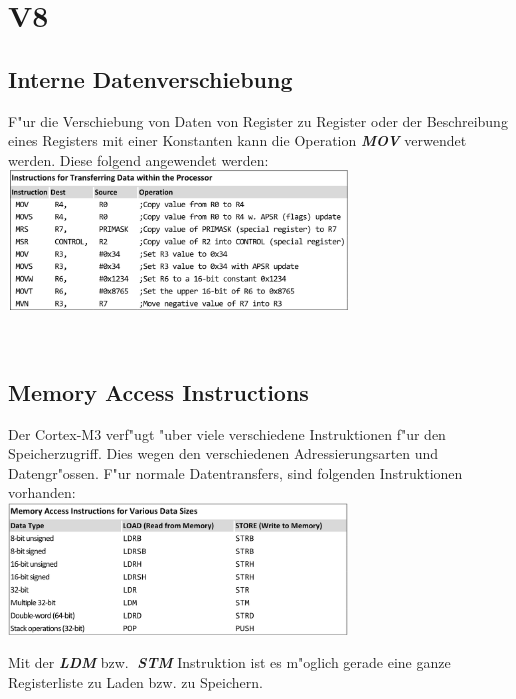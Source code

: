 \section{V8}
\begin{minipage}[t]{9cm}
	\subsection{Interne Datenverschiebung}
F"ur die Verschiebung von Daten von Register zu Register oder der Beschreibung eines Registers mit einer Konstanten kann die Operation \textbf{\textit{MOV} }verwendet werden. Diese folgend angewendet werden: \\

\includegraphics[width=9cm]{images/MOV-Instruktion}
\end{minipage}
%
\begin{minipage}[t]{0.5cm}
	\-\
\end{minipage}
%
\begin{minipage}[t]{9cm}
	\subsection{Memory Access Instructions}
Der Cortex-M3 verf"ugt "uber viele verschiedene Instruktionen f"ur den Speicherzugriff. Dies wegen den verschiedenen Adressierungsarten und Datengr"ossen. F"ur normale Datentransfers, sind folgenden Instruktionen vorhanden:\\

\includegraphics[width=9cm]{images/LDR-Instruktion}

Mit der \textbf{\textit{LDM}} bzw. \textbf{\textit{STM}} Instruktion ist es m"oglich gerade eine ganze Registerliste zu Laden bzw. zu Speichern.
\end{minipage}

